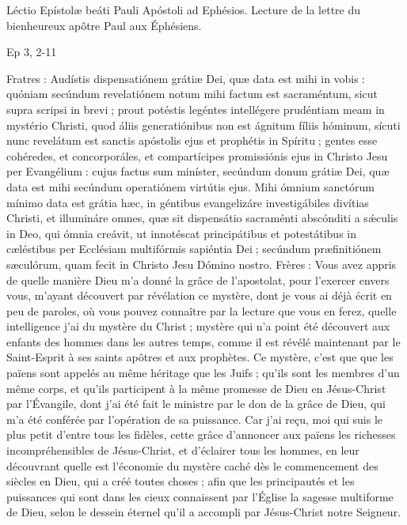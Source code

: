 \begin{paracol}{2}
Léctio Epístolæ beáti Pauli Apóstoli ad Ephésios.
\switchcolumn
Lecture de la lettre du bienheureux apôtre Paul aux Éphésiens.
\switchcolumn*

Ep 3, 2-11
\switchcolumn

\switchcolumn*

Fratres : Audístis dispensatiónem  grátiæ Dei, quæ data est mihi in vobis : quóniam secúndum revelatiónem notum mihi factum est sacraméntum, sicut supra scripsi in brevi ; prout potéstis legéntes intellégere prudéntiam meam in mystério Christi, quod áliis generatiónibus non est ágnitum fíliis hóminum, sícuti nunc revelátum est sanctis apóstolis ejus et prophétis in Spíritu ; gentes esse cohéredes, et concorporáles, et compartícipes promissiónis ejus in Christo Jesu per Evangélium : cujus factus sum miníster, secúndum donum grátiæ Dei, quæ data est mihi secúndum operatiónem virtútis ejus. Mihi ómnium sanctórum mínimo data est grátia hæc, in géntibus evangelizáre investigábiles divítias Christi, et illumináre omnes, quæ sit dispensátio sacraménti abscónditi a sǽculis in Deo, qui ómnia creávit, ut innotéscat principátibus et potestátibus in cæléstibus per Ecclésiam multifórmis sapiéntia Dei ; secúndum præfinitiónem sæculórum, quam fecit in Christo Jesu Dómino nostro.
\switchcolumn
Frères : Vous avez appris de quelle manière Dieu m’a donné la grâce de l’apostolat, pour l’exercer envers vous, m’ayant découvert par révélation ce mystère, dont je vous ai déjà écrit en peu de paroles, où vous pouvez connaître par la lecture que vous en ferez, quelle intelligence j’ai du mystère du Christ ; mystère qui n’a point été découvert aux enfants des hommes dans les autres temps, comme il est révélé maintenant par le Saint-Esprit à ses saints apôtres et aux prophètes. Ce mystère, c’est que que les païens sont appelés au même héritage que les Juifs ; qu’ils sont les membres d’un même corps, et qu’ils participent à la même promesse de Dieu en Jésus-Christ par l’Évangile, dont j’ai été fait le ministre par le don de la grâce de Dieu, qui m’a été conférée par l’opération de sa puissance. Car j’ai reçu, moi qui suis le plus petit d’entre tous les fidèles, cette grâce d’annoncer aux païens les richesses incompréhensibles de Jésus-Christ, et d’éclairer tous les hommes, en leur découvrant quelle est l’économie du mystère caché dès le commencement des siècles en Dieu, qui a créé toutes choses ; afin que les principautés et les puissances qui sont dans les cieux connaissent par l’Église la sagesse multiforme de Dieu, selon le dessein éternel qu’il a accompli par Jésus-Christ notre Seigneur.
\switchcolumn*


\end{paracol}
